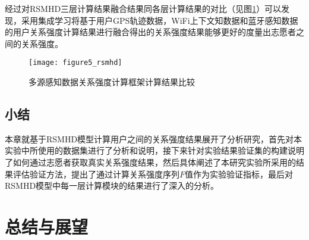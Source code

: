 \par 经过对RSMHD三层计算结果融合结果同各层计算结果的对比（见图\ref{fig:result_rsmhd}）可以发现，采用集成学习将基于用户GPS轨迹数据，WiFi上下文知数据和蓝牙感知数据的用户关系强度计算结果进行融合得出的关系强度结果能够更好的度量出志愿者之间的关系强度。
\begin{figure}[htb]
\centering
\texttt{[image: figure5\_rsmhd]}
\caption{多源感知数据关系强度计算框架计算结果比较}
\label{fig:result_rsmhd}
\end{figure}
\newpage
\section{小结}
\label{sec:section5-4}
本章就基于RSMHD模型计算用户之间的关系强度结果展开了分析研究，首先对本实验中所使用的数据集进行了分析和说明，接下来针对实验结果验证集的构建说明了如何通过志愿者获取真实关系强度结果，然后具体阐述了本研究实验所采用的结果评估验证方法，提出了通过计算关系强度序列$F$值作为实验验证指标，最后对RSMHD模型中每一层计算模块的结果进行了深入的分析。
\chapter{总结与展望}
\label{chap:chapter06}
